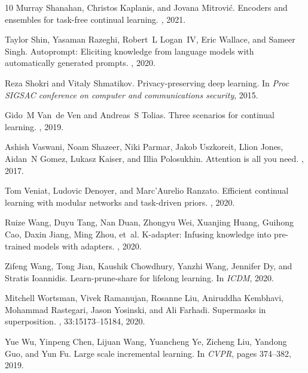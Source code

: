 \documentclass[10pt,twocolumn,letterpaper]{article}
\begin{document}
\begin{thebibliography}{10}
Murray Shanahan, Christos Kaplanis, and Jovana Mitrovi{\'c}.
\newblock Encoders and ensembles for task-free continual learning.
, 2021.

Taylor Shin, Yasaman Razeghi, Robert~L Logan~IV, Eric Wallace, and Sameer
  Singh.
\newblock Autoprompt: Eliciting knowledge from language models with
  automatically generated prompts.
, 2020.

Reza Shokri and Vitaly Shmatikov.
\newblock Privacy-preserving deep learning.
\newblock In {\em Proc SIGSAC conference on computer and communications
  security}, 2015.

Gido~M Van~de Ven and Andreas~S Tolias.
\newblock Three scenarios for continual learning.
, 2019.

Ashish Vaswani, Noam Shazeer, Niki Parmar, Jakob Uszkoreit, Llion Jones,
  Aidan~N Gomez, Lukasz Kaiser, and Illia Polosukhin.
\newblock Attention is all you need.
, 2017.

Tom Veniat, Ludovic Denoyer, and Marc'Aurelio Ranzato.
\newblock Efficient continual learning with modular networks and task-driven
  priors.
, 2020.

Ruize Wang, Duyu Tang, Nan Duan, Zhongyu Wei, Xuanjing Huang, Guihong Cao,
  Daxin Jiang, Ming Zhou, et~al.
\newblock K-adapter: Infusing knowledge into pre-trained models with adapters.
, 2020.

Zifeng Wang, Tong Jian, Kaushik Chowdhury, Yanzhi Wang, Jennifer Dy, and
  Stratis Ioannidis.
\newblock Learn-prune-share for lifelong learning.
\newblock In {\em ICDM}, 2020.

Mitchell Wortsman, Vivek Ramanujan, Rosanne Liu, Aniruddha Kembhavi, Mohammad
  Rastegari, Jason Yosinski, and Ali Farhadi.
\newblock Supermasks in superposition.
, 33:15173--15184, 2020.

Yue Wu, Yinpeng Chen, Lijuan Wang, Yuancheng Ye, Zicheng Liu, Yandong Guo, and
  Yun Fu.
\newblock Large scale incremental learning.
\newblock In {\em CVPR}, pages 374--382, 2019.


\end{thebibliography}
\end{document}
